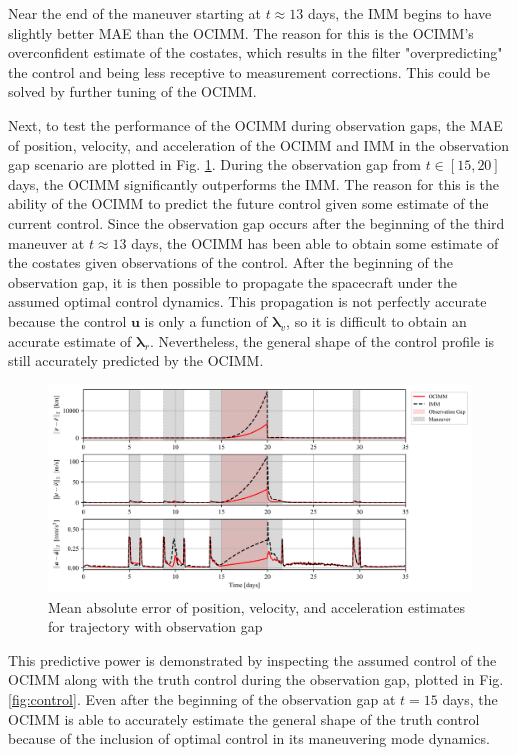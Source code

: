 \documentclass[letterpaper, preprint, paper,11pt]{AAS}	%
\begin{document}
Near the end of the maneuver starting at $t \approx 13$ days, the IMM begins to have slightly better MAE than the OCIMM. The reason for this is the OCIMM's overconfident estimate of the costates, which results in the filter "overpredicting" the control and being less receptive to measurement corrections. This could be solved by further tuning of the OCIMM.

Next, to test the performance of the OCIMM during observation gaps, the MAE of position, velocity, and acceleration of the OCIMM and IMM in the observation gap scenario are plotted in Fig. \ref{fig:MAE-gap}. During the observation gap from $t \in [15, 20]$ days, the OCIMM significantly outperforms the IMM. The reason for this is the ability of the OCIMM to predict the future control given some estimate of the current control. Since the observation gap occurs after the beginning of the third maneuver at $t \approx 13$ days, the OCIMM has been able to obtain some estimate of the costates given observations of the control. After the beginning of the observation gap, it is then possible to propagate the spacecraft under the assumed optimal control dynamics. This propagation is not perfectly accurate because the control $\bm{u}$ is only a function of $\bm{\lambda}_v$, so it is difficult to obtain an accurate estimate of $\bm{\lambda}_r$. Nevertheless, the general shape of the control profile is still accurately predicted by the OCIMM.

\begin{figure}
    \centering
    \includegraphics[width=1\linewidth]{Figures/MAE_gap.png}
    \caption{Mean absolute error of position, velocity, and acceleration estimates for trajectory with observation gap}
    \label{fig:MAE-gap}
\end{figure}

This predictive power is demonstrated by inspecting the assumed control of the OCIMM along with the truth control during the observation gap, plotted in Fig. \ref{fig:control}. Even after the beginning of the observation gap at $t=15$ days, the OCIMM is able to accurately estimate the general shape of the truth control because of the inclusion of optimal control in its maneuvering mode dynamics.  
\end{document}
